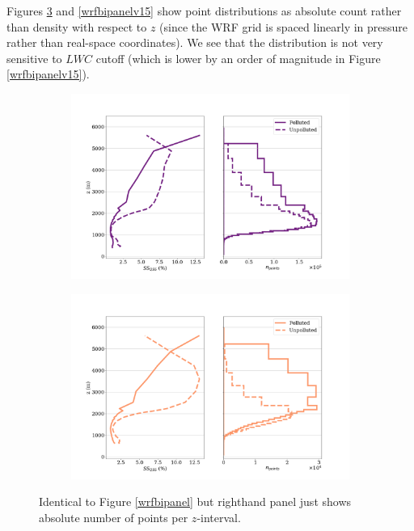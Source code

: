 \documentclass{article}
\begin{document}
Figures \ref{wrfbipanelv14} and \ref{wrfbipanelv15} show point distributions as absolute count rather than density with respect to $z$ (since the WRF grid is spaced linearly in pressure rather than real-space coordinates). We see that the distribution is not very sensitive to $LWC$ cutoff (which is lower by an order of magnitude in Figure \ref{wrfbipanelv15}).

\begin{figure}[ht]
	\centering
	\begin{subfigure}{0.7\textwidth}
		\includegraphics[width=\textwidth]{revmywrf/v14_FINAL_bipanel_ss_qss_vs_z_allpts_figure.png}
		\caption{}
		\label{wrfbipanelallptsv14}
	\end{subfigure}
	\begin{subfigure}{0.7\textwidth}
		\includegraphics[width=\textwidth]{revmywrf/v14_FINAL_bipanel_ss_qss_vs_z_up10perc_figure.png}
		\caption{}
		\label{wrfbipanelup50percv14}
	\end{subfigure}
	\caption{Identical to Figure \ref{wrfbipanel} but righthand panel just shows absolute number of points per $z$-interval.}
	\label{wrfbipanelv14}
\end{figure}
\end{document}
